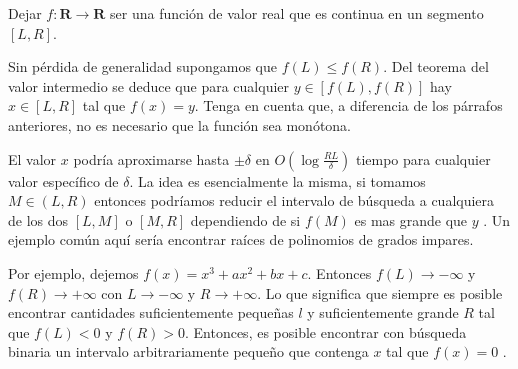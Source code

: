 Dejar $f : \mathbf{R}  \to \mathbf{R} $ ser una función de valor real que es continua en un segmento $[L, R]$.

Sin pérdida de generalidad supongamos que $f(L) \leq f(R)$. Del teorema del valor intermedio se deduce que para cualquier $y \in [f(L), f(R)]$ hay $x \in [L, R]$ tal que $f(x) = y$. Tenga en cuenta que, a diferencia de los párrafos anteriores, no es necesario que la función sea monótona.

El valor $x$ podría aproximarse hasta $\pm\delta$ en $O\left(\log \frac{RL}{\delta}\right)$ tiempo para 
cualquier valor específico de $\delta$. La idea es esencialmente la misma, si tomamos $M \in (L, R)$ entonces 
podríamos reducir el intervalo de búsqueda a cualquiera de los dos $[L,M]$ o $[M,R]$ dependiendo de si $f(M)$ es mas grande que $y$ . Un ejemplo común aquí sería encontrar raíces de polinomios de grados impares.


Por ejemplo, dejemos $f(x)=x^3 + ax^2 + bx + c$. Entonces $f(L) \to -\infty$ y $f(R) \to +\infty$ con
$L \to -\infty$ y $R \to +\infty$. Lo que significa que siempre es posible encontrar cantidades 
suficientemente pequeñas $l$ y suficientemente grande $R$ tal que $f(L) < 0$ y $f(R) > 0$. Entonces, es 
posible encontrar con búsqueda binaria un intervalo arbitrariamente pequeño que contenga $x$ tal que $f(x)=0$ .
